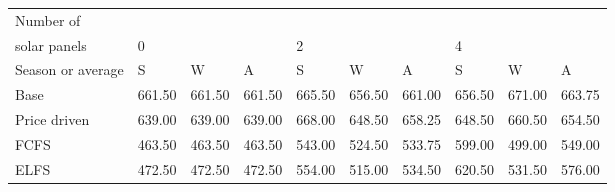 \begin{table}[h] 
\centering 
\begin{tabular}{l|lll|lll|lll}Number of \\ solar panels&0& & &2& & &4& & \\ \hline 
Season or average & S & W & A & S & W & A & S & W & A \\ \hline 
Base&661.50&661.50&661.50&665.50&656.50&661.00&656.50&671.00&663.75 \\ 
Price driven&639.00&639.00&639.00&668.00&648.50&658.25&648.50&660.50&654.50 \\ 
FCFS&463.50&463.50&463.50&543.00&524.50&533.75&599.00&499.00&549.00 \\ 
ELFS&472.50&472.50&472.50&554.00&515.00&534.50&620.50&531.50&576.00 \\ 
\end{tabular} 
\end{table}